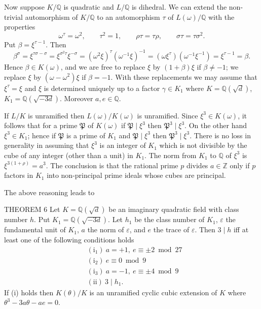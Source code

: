 Now suppose $K/\mathbb{Q}$ is quadratic and $L/\mathbb{Q}$ is dihedral.
We can extend the non-trivial automorphism of $K/\mathbb{Q}$ to an
automorphism $\tau$ of $L(\omega)/\mathbb{Q}$ with the properties
\[
\omega^{\tau}=\omega^{2},\qquad\tau^{2}=1,\qquad
\rho\tau=\tau\rho,\qquad\sigma\tau=\tau\sigma^{2}.
\]
Put $\beta=\xi^{\tau-1}$. Then
\[
\beta^{\sigma}=\xi^{\tau\sigma-\sigma}
=\xi^{\sigma^{2}\tau}\xi^{-\sigma}
=(\omega^{2}\xi)^{\tau}(\omega^{-1}\xi)^{-1}
=(\omega\xi^{\tau})(\omega^{-1}\xi^{-1})
=\xi^{\tau-1}=\beta.
\]
Hence $\beta\in K(\omega)$, and we are free to replace $\xi$ by
$(1+\beta)\xi$ if $\beta\neq -1$; we replace $\xi$ by
$(\omega-\omega^{2})\xi$ if $\beta=-1$. With these replacements we may
assume that $\xi^{\tau}=\xi$ and $\xi$ is determined uniquely up to a
factor $\gamma\in K_{1}$ where $K=\mathbb{Q}(\sqrt{d})$,
$K_{1}=\mathbb{Q}(\sqrt{-3d})$. Moreover $a,e\in\mathbb{Q}$.

If $L/K$ is unramified then $L(\omega)/K(\omega)$ is unramified. Since
$\xi^{3}\in K(\omega)$, it follows that for a prime $\mathfrak{P}$ of
$K(\omega)$ if $\mathfrak{P}\mid\xi^{3}$ then
$\mathfrak{P}^{3}\mid\xi^{3}$. On the other hand $\xi^{3}\in K_{1}$;
hence if $\mathfrak{P}$ is a prime of $K_{1}$ and
$\mathfrak{P}\mid\xi^{3}$ then $\mathfrak{P}^{3}\mid\xi^{3}$. There is no
loss in generality in assuming that $\xi^{3}$ is an integer of $K_{1}$
which is not divisible by the cube of any integer (other than a unit) in
$K_{1}$. The norm from $K_{1}$ to $\mathbb{Q}$ of $\xi^{3}$ is
$\xi^{3(1+\rho)}=a^{3}$. The conclusion is that the rational prime $p$
divides $a\in\mathbb{Z}$ only if $p$ factors in $K_{1}$ into
non-principal prime ideals whose cubes are principal.

The above reasoning leads to

\begin{namedstmt}{THEOREM 6}
Let $K=\mathbb{Q}(\sqrt{d})$ be an imaginary quadratic field with class
number $h$. Put $K_{1}=\mathbb{Q}(\sqrt{-3d})$. Let $h_{1}$ be the class
number of $K_{1}$, $\varepsilon$ the fundamental unit of $K_{1}$, $a$ the
norm of $\varepsilon$, and $e$ the trace of $\varepsilon$. Then $3\mid h$
iff at least one of the following conditions holds
\[
\begin{aligned}
&(\mathrm{i}_{1})\ a=+1,\ e\equiv\pm 2\bmod 27\\
&(\mathrm{i}_{2})\ e\equiv 0\bmod 9\\
&(\mathrm{i}_{3})\ a=-1,\ e\equiv\pm 4\bmod 9\\
&(\mathrm{ii})\ 3\mid h_{1}.
\end{aligned}
\]
If (i) holds then $K(\theta)/K$ is an unramified cyclic cubic extension
of $K$ where $\theta^{3}-3a\theta-ae=0$.
\end{namedstmt}

